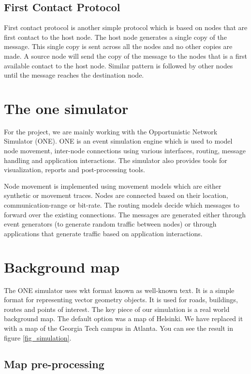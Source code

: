 \documentclass[conference]{IEEEtran}
\begin{document}
\subsection{First Contact Protocol}
First contact protocol is another simple protocol which is based on nodes that are first contact to the host node. The host node generates a single copy of the message. This single copy is sent across all the nodes and no other copies are made. A source node will send the copy of the message to the nodes that is a first available contact to the host node. Similar pattern is followed by other nodes until the message reaches the destination node. 



\section{The one simulator}

For the project, we are mainly working with the Opportunistic Network Simulator (ONE). ONE is an event simulation engine which is used to model node movement, inter-node connections using various interfaces, routing, message handling and application interactions. The simulator also provides tools for visualization, reports and post-processing tools.

Node movement is implemented using movement models which are either synthetic or movement traces. Nodes are connected based on their location, communication-range or bit-rate. The routing models decide which messages to forward over the existing connections. The messages are generated either through event generators (to generate random traffic between nodes) or through applications that generate traffic based on application interactions.

\section{Background map}

The ONE simulator uses wkt format known as well-known text. It is a simple format for representing vector geometry objects. It is used for roads, buildings, routes and points of interest. The key piece of our simulation is a real world background map. The default option was a map of Helsinki. We have replaced it with a map of the Georgia Tech campus in Atlanta. You can see the result in figure \ref{fig_simulation}.

\subsection{Map pre-processing}
\end{document}
